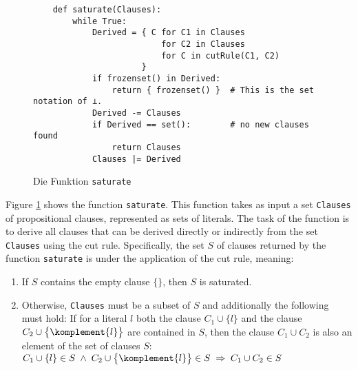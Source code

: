 \begin{figure}[!ht]
\centering
\begin{verbatim}
    def saturate(Clauses):
        while True:
            Derived = { C for C1 in Clauses
                          for C2 in Clauses
                          for C in cutRule(C1, C2)
                      }
            if frozenset() in Derived:
                return { frozenset() }  # This is the set notation of ⊥.
            Derived -= Clauses
            if Derived == set():        # no new clauses found
                return Clauses
            Clauses |= Derived
\end{verbatim}
\vspace*{-0.3cm}
\caption{Die Funktion \texttt{saturate}}
\label{fig:Completeness.ipynb-2}
\end{figure}
Figure \ref{fig:Completeness.ipynb-2} shows the function \texttt{saturate}. This function takes
as input a set \texttt{Clauses} of propositional clauses, represented as sets of literals.
The task of the function is to derive all clauses that can be derived directly or indirectly from the set \texttt{Clauses}
using the cut rule. Specifically, the set $S$ of clauses returned by the function \texttt{saturate}
is  under the application of the cut rule, meaning:

\begin{enumerate}
\item If $S$ contains the empty clause $\{\}$, then $S$ is saturated.
\item Otherwise, \texttt{Clauses} must be a subset of $S$ and additionally the following must hold:
      If for a literal $l$ both the clause $C_1 \cup \{ l \}$ and the clause $C_2 \cup
      \bigl\{ \komplement{l} \bigr\}$ are contained in $S$,
      then the clause $C_1 \cup C_2$ is also an element of the set of clauses $S$:
      \\[0.2cm]
      \hspace*{1.3cm}
      $C_1 \cup \{ l \} \in S \;\wedge\; C_2 \cup \bigl\{ \komplement{l} \bigr\} \in S \;\Rightarrow\; C_1 \cup C_2 \in S$
\end{enumerate}

